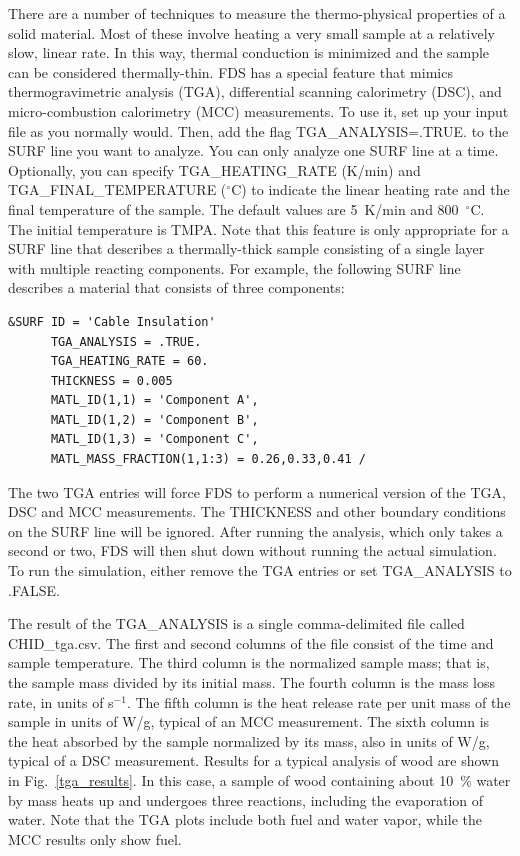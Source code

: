 \documentclass[11pt]{book}
\begin{document}
There are a number of techniques to measure the thermo-physical properties of a solid material. Most of these involve heating a very small sample at a relatively slow, linear rate. In this way, thermal conduction is minimized and the sample can be considered thermally-thin. FDS has a special feature that mimics thermogravimetric analysis (TGA), differential scanning calorimetry (DSC), and micro-combustion calorimetry (MCC) measurements. To use it, set up your input file as you normally would. Then, add the flag {\ct TGA\_ANALYSIS=.TRUE.} to the {\ct SURF} line you want to analyze. You can only analyze one {\ct SURF} line at a time. Optionally, you can specify {\ct TGA\_HEATING\_RATE} (K/min) and {\ct TGA\_FINAL\_TEMPERATURE} ($^\circ$C) to indicate the linear heating rate and the final temperature of the sample. The default values are 5~K/min and 800~$^\circ$C. The initial temperature is {\ct TMPA}. Note that this feature is only appropriate for a {\ct SURF} line that describes a thermally-thick sample consisting of a single layer with multiple reacting components. For example, the following {\ct SURF} line describes a material that consists of three components:
\begin{lstlisting}
&SURF ID = 'Cable Insulation'
      TGA_ANALYSIS = .TRUE.
      TGA_HEATING_RATE = 60.
      THICKNESS = 0.005
      MATL_ID(1,1) = 'Component A',
      MATL_ID(1,2) = 'Component B',
      MATL_ID(1,3) = 'Component C',
      MATL_MASS_FRACTION(1,1:3) = 0.26,0.33,0.41 /
\end{lstlisting}
The two {\ct TGA} entries will force FDS to perform a numerical version of the TGA, DSC and MCC measurements. The {\ct THICKNESS} and other boundary conditions on the {\ct SURF} line will be ignored. After running the analysis, which only takes a second or two, FDS will then shut down without running the actual simulation. To run the simulation, either remove the {\ct TGA} entries or set {\ct TGA\_ANALYSIS} to {\ct .FALSE.}

The result of the {\ct TGA\_ANALYSIS} is a single comma-delimited file called {\ct CHID\_tga.csv}. The first and second columns of the file consist of the time and sample temperature. The third column is the normalized sample mass; that is, the sample mass divided by its initial mass. The fourth column is the mass loss rate, in units of s$^{-1}$. The fifth column is the heat release rate per unit mass of the sample in units of W/g, typical of an MCC measurement. The sixth column is the heat absorbed by the sample normalized by its mass, also in units of W/g, typical of a DSC measurement. Results for a typical analysis of wood are shown in Fig.~\ref{tga_results}. In this case, a sample of wood containing about 10~\% water by mass heats up and undergoes three reactions, including the evaporation of water. Note that the TGA plots include both fuel and water vapor, while the MCC results only show fuel.
\end{document}

